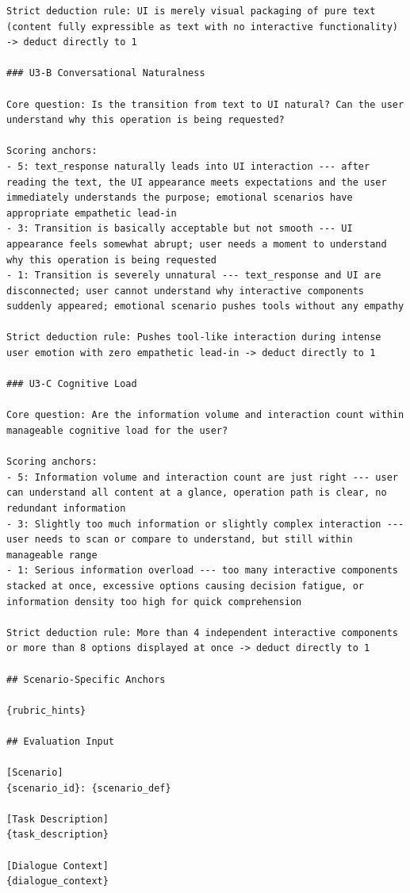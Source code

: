 \begin{verbatim}
Strict deduction rule: UI is merely visual packaging of pure text (content fully expressible as text with no interactive functionality) -> deduct directly to 1

### U3-B Conversational Naturalness

Core question: Is the transition from text to UI natural? Can the user understand why this operation is being requested?

Scoring anchors:
- 5: text_response naturally leads into UI interaction --- after reading the text, the UI appearance meets expectations and the user immediately understands the purpose; emotional scenarios have appropriate empathetic lead-in
- 3: Transition is basically acceptable but not smooth --- UI appearance feels somewhat abrupt; user needs a moment to understand why this operation is being requested
- 1: Transition is severely unnatural --- text_response and UI are disconnected; user cannot understand why interactive components suddenly appeared; emotional scenario pushes tools without any empathy

Strict deduction rule: Pushes tool-like interaction during intense user emotion with zero empathetic lead-in -> deduct directly to 1

### U3-C Cognitive Load

Core question: Are the information volume and interaction count within manageable cognitive load for the user?

Scoring anchors:
- 5: Information volume and interaction count are just right --- user can understand all content at a glance, operation path is clear, no redundant information
- 3: Slightly too much information or slightly complex interaction --- user needs to scan or compare to understand, but still within manageable range
- 1: Serious information overload --- too many interactive components stacked at once, excessive options causing decision fatigue, or information density too high for quick comprehension

Strict deduction rule: More than 4 independent interactive components or more than 8 options displayed at once -> deduct directly to 1

## Scenario-Specific Anchors

{rubric_hints}

## Evaluation Input

[Scenario]
{scenario_id}: {scenario_def}

[Task Description]
{task_description}

[Dialogue Context]
{dialogue_context}


\end{verbatim}
